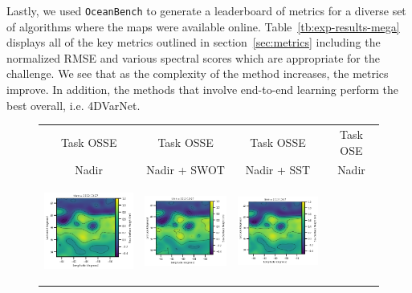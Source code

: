 Lastly, we used \texttt{OceanBench} to generate a leaderboard of metrics for a diverse set of algorithms where the maps were available online.
Table~\ref{tb:exp-results-mega} displays all of the key metrics outlined in section~\ref{sec:metrics} including the normalized RMSE and various spectral scores which are appropriate for the challenge.
We see that as the complexity of the method increases, the metrics improve. 
In addition, the methods that involve end-to-end learning perform the best overall, i.e. 4DVarNet.

\begin{figure}[ht!]
\small
\begin{center}
\setlength{\tabcolsep}{1pt}
\begin{tabular}{cccc}
\hspace{3mm} Task OSSE & 
\hspace{3mm} Task OSSE & 
\hspace{2mm} Task OSSE & 
Task OSE \\
\hspace{3mm}  Nadir & 
\hspace{3mm} Nadir + SWOT & 
\hspace{2mm} Nadir + SST & 
Nadir \\
\includegraphics[trim={0 13mm 22mm 0},clip, width=3.60cm,height=3.2cm]{content/figures/fourdvarnet_figs/osse_gf_nadir_ssh.png} &
\includegraphics[trim={13mm 13mm 22mm 0},clip, width=3.2cm,height=3.2cm]{content/figures/fourdvarnet_figs/osse_gf_nadirswot_ssh.png} &
\includegraphics[trim={13mm 13mm 22mm 0},clip, width=3.2cm,height=3.2cm]{content/figures/fourdvarnet_figs/osse_gf_nadir_sst_ssh.png} &

\end{tabular}
\end{center}
\end{figure}
